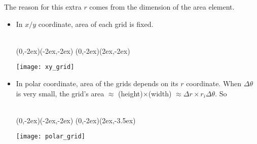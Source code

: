 \documentclass[class=article, crop=false, 12pt]{standalone}
\begin{document}
The reason for this extra $r$ comes from the dimension of the area element.

\begin{itemize}
    \item In $x/y$ coordinate, area of each grid is fixed.
    
    \begin{minipage}{0.7\textwidth}
        \\
        {(0,-2ex)}{(-2ex,-2ex)}
        {(0,-2ex)}{(2ex,-2ex)}
    \end{minipage}
    \begin{minipage}{0.28\textwidth}
        \texttt{[image: xy\_grid]}
    \end{minipage}
    

    \item In polar coordinate, area of the grids depends on its $r$ coordinate.
    When $\Delta \theta$ is very small, 
    the grid's area $\approx$ (height)$\times$(width) $\approx \Delta r\times r_i\Delta \theta$. So

    \begin{minipage}{0.6\textwidth}
        \\
        {(0,-2ex)}{(-2ex,-2ex)}
        {(0,-2ex)}{(2ex,-3.5ex)}
    \end{minipage}
    \begin{minipage}{0.38\textwidth}
        \texttt{[image: polar\_grid]}
    \end{minipage}


\end{itemize}
\end{document}
